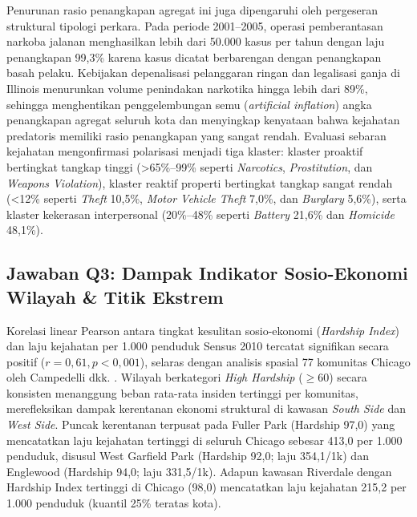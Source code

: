 \documentclass[11pt,a4paper]{article}
\begin{document}
Penurunan rasio penangkapan agregat ini juga dipengaruhi oleh pergeseran struktural tipologi perkara. Pada periode 2001--2005, operasi pemberantasan narkoba jalanan menghasilkan lebih dari 50.000 kasus per tahun dengan laju penangkapan 99,3\% karena kasus dicatat berbarengan dengan penangkapan basah pelaku. Kebijakan depenalisasi pelanggaran ringan dan legalisasi ganja di Illinois menurunkan volume penindakan narkotika hingga lebih dari 89\%, sehingga menghentikan penggelembungan semu (\textit{artificial inflation}) angka penangkapan agregat seluruh kota dan menyingkap kenyataan bahwa kejahatan predatoris memiliki rasio penangkapan yang sangat rendah. Evaluasi sebaran kejahatan mengonfirmasi polarisasi menjadi tiga klaster: klaster proaktif bertingkat tangkap tinggi (>65\%--99\% seperti \textit{Narcotics}, \textit{Prostitution}, dan \textit{Weapons Violation}), klaster reaktif properti bertingkat tangkap sangat rendah (<12\% seperti \textit{Theft} 10,5\%, \textit{Motor Vehicle Theft} 7,0\%, dan \textit{Burglary} 5,6\%), serta klaster kekerasan interpersonal (20\%--48\% seperti \textit{Battery} 21,6\% dan \textit{Homicide} 48,1\%).

\subsection{Jawaban Q3: Dampak Indikator Sosio-Ekonomi Wilayah \& Titik Ekstrem}
Korelasi linear Pearson antara tingkat kesulitan sosio-ekonomi (\textit{Hardship Index}) dan laju kejahatan per 1.000 penduduk Sensus 2010 tercatat signifikan secara positif ($r = 0,61, p < 0,001$), selaras dengan analisis spasial 77 komunitas Chicago oleh Campedelli dkk. \cite{campedelli2020}. Wilayah berkategori \textit{High Hardship} ($\ge 60$) secara konsisten menanggung beban rata-rata insiden tertinggi per komunitas, merefleksikan dampak kerentanan ekonomi struktural di kawasan \textit{South Side} dan \textit{West Side}. Puncak kerentanan terpusat pada Fuller Park (Hardship 97,0) yang mencatatkan laju kejahatan tertinggi di seluruh Chicago sebesar 413,0 per 1.000 penduduk, disusul West Garfield Park (Hardship 92,0; laju 354,1/1k) dan Englewood (Hardship 94,0; laju 331,5/1k). Adapun kawasan Riverdale dengan Hardship Index tertinggi di Chicago (98,0) mencatatkan laju kejahatan 215,2 per 1.000 penduduk (kuantil 25\% teratas kota).
\end{document}
